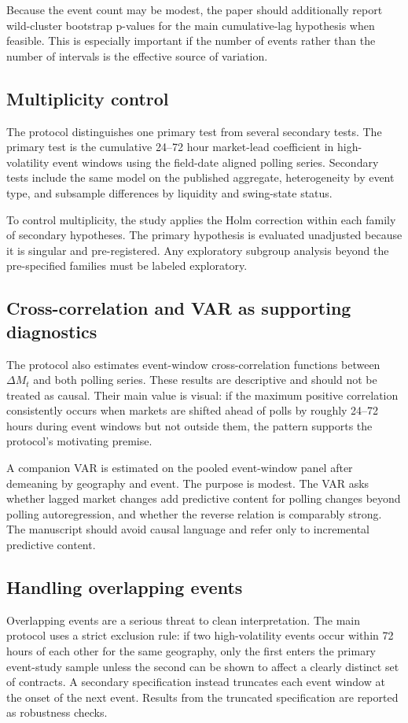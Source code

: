 \documentclass[11pt]{article}
\begin{document}
Because the event count may be modest, the paper should additionally report wild-cluster bootstrap p-values for the main cumulative-lag hypothesis when feasible. This is especially important if the number of events rather than the number of intervals is the effective source of variation.

\subsection{Multiplicity control}
The protocol distinguishes one primary test from several secondary tests. The primary test is the cumulative 24--72 hour market-lead coefficient in high-volatility event windows using the field-date aligned polling series. Secondary tests include the same model on the published aggregate, heterogeneity by event type, and subsample differences by liquidity and swing-state status.

To control multiplicity, the study applies the Holm correction within each family of secondary hypotheses. The primary hypothesis is evaluated unadjusted because it is singular and pre-registered. Any exploratory subgroup analysis beyond the pre-specified families must be labeled exploratory.

\subsection{Cross-correlation and VAR as supporting diagnostics}
The protocol also estimates event-window cross-correlation functions between $\Delta M_t$ and both polling series. These results are descriptive and should not be treated as causal. Their main value is visual: if the maximum positive correlation consistently occurs when markets are shifted ahead of polls by roughly 24--72 hours during event windows but not outside them, the pattern supports the protocol's motivating premise.

A companion VAR is estimated on the pooled event-window panel after demeaning by geography and event. The purpose is modest. The VAR asks whether lagged market changes add predictive content for polling changes beyond polling autoregression, and whether the reverse relation is comparably strong. The manuscript should avoid causal language and refer only to incremental predictive content.

\subsection{Handling overlapping events}
Overlapping events are a serious threat to clean interpretation. The main protocol uses a strict exclusion rule: if two high-volatility events occur within 72 hours of each other for the same geography, only the first enters the primary event-study sample unless the second can be shown to affect a clearly distinct set of contracts. A secondary specification instead truncates each event window at the onset of the next event. Results from the truncated specification are reported as robustness checks.
\end{document}
